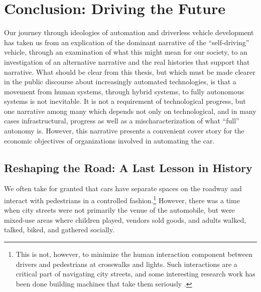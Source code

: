 \chapter{Conclusion: Driving the Future}
\label{chap:4}



Our journey through ideologies of automation and driverless vehicle
development has taken us from an explication of the dominant narrative
of the ``self-driving'' vehicle, through an examination of what this
might mean for our society, to an investigation of an alternative
narrative and the real histories that support that narrative. What
should be clear from this thesis, but which must be made clearer in the
public discourse about increasingly automated technologies, is that a
movement from human systems, through hybrid systems, to fully
autonomous systems is not inevitable. It is not a
requirement of technological progress, but one narrative among many
which depends not only on technological, and in many cases 
infrastructural, progress as well as a mischaracterization of what
``full'' autonomy is. However, this narrative
presents a convenient cover story for the economic objectives of
organizations involved in automating the car.

\section{Reshaping the Road: A Last Lesson in History}

We often take for granted that cars have separate spaces on
the roadway and interact with pedestrians in a controlled
fashion.\footnote{This is not, however, to minimize the human
  interaction component between drivers and pedestrians at crosswalks
  and lights. Such interactions are a critical part of navigating city
  streets, and some interesting research work has been done building
  machines that take them seriously \cite{aevita}.} However, there was a
time when city streets were not primarily the venue of the automobile,
but were mixed-use areas where children played, vendors sold goods,
and adults walked, talked, biked, and gathered socially. 


